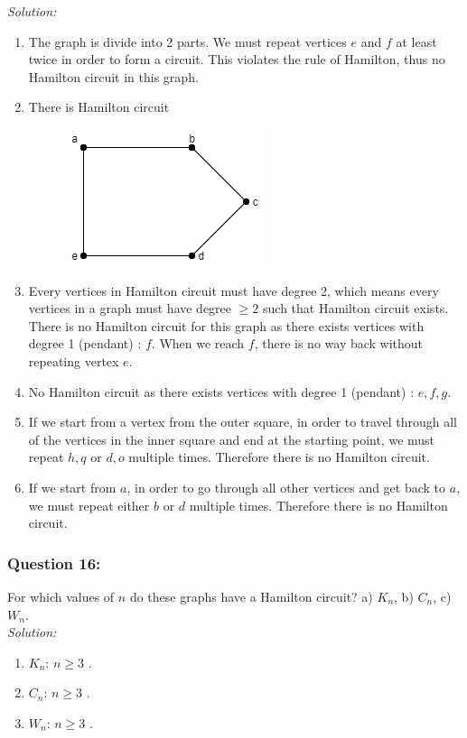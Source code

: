 \documentclass[a4paper]{article}
\begin{document}
	\emph{Solution:}
	\begin{enumerate}[label = \alph*)]
	    \item The graph is divide into 2 parts. We must repeat vertices $e$ and $f$ at least twice in order to form a circuit. This violates the rule of Hamilton, thus no Hamilton circuit in this graph.
	    \item There is Hamilton circuit
	    \begin{figure}[H]
	        \centering
	        \includegraphics[width = 0.3 \textwidth]{tut915_7.png}
	    \end{figure}
	    \item Every vertices in Hamilton circuit must have degree 2, which means every vertices in a graph must have degree $
	    \geq 2$ such that Hamilton circuit exists. There is no Hamilton circuit for this graph as there exists vertices with degree 1 (pendant) : $f$. When we reach $f$, there is no way back without repeating vertex $e$.
	    \item No Hamilton circuit as there exists vertices with degree 1 (pendant) : $e,f,g$. 
	    \item If we start from a vertex from the outer square, in order to travel through all of the vertices in the inner square and end at the starting point, we must repeat $h,q$ or $d,o$ multiple times. Therefore there is no Hamilton circuit.
	    \item If we start from $a$, in order to go through all other vertices and get back to $a$, we must repeat either $b$ or $d$ multiple times. Therefore there is no Hamilton circuit.
	\end{enumerate}
	\subsubsection*{Question 16:}
	For which values of $n$ do these graphs have a Hamilton circuit? a) $K_n$, b) $C_n$, c) $W_n$.\\
	\emph{Solution:}
	\begin{enumerate}[label = \alph*)]
	    \item $K_n$: $n \geq 3$ .
	    \item $C_n$: $n \geq 3$ .
	    \item $W_n$: $n \geq 3$ .
	\end{enumerate}
\end{document}
